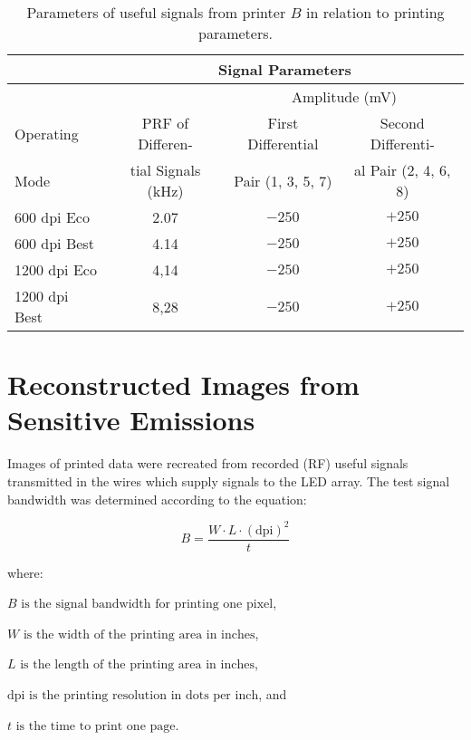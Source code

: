\documentclass[10pt,a4paper]{article}
\begin{document}
\begin{table}[ht]
    \centering
    \begin{tabular}{|l|c|c|c|}
        \hline
        & \multicolumn{3}{c|}{Signal Parameters} \\
        \hline
        & & \multicolumn{2}{c|}{Amplitude (\si{\milli\volt})} \\
        \hline
        Operating & PRF of Differen-
            & First Differential & Second Differenti- \\
        Mode & tial Signals (\si{\kilo\hertz})
            & Pair (1, 3, 5, 7) & al Pair (2, 4, 6, 8) \\
        \hline
        600 dpi Eco   & 2.07 & $-250$ & $+250$ \\
        600 dpi Best  & 4.14 & $-250$ & $+250$ \\
        1200 dpi Eco  & 4,14 & $-250$ & $+250$ \\
        1200 dpi Best & 8,28 & $-250$ & $+250$ \\
        \hline
    \end{tabular}
    \caption{Parameters of useful signals from printer $B$ in relation to
        printing parameters.}
    \label{table:Table_2}
\end{table}

\section{Reconstructed Images from Sensitive Emissions}

Images of printed data were recreated from recorded (RF) useful signals
transmitted in the wires which supply signals to the LED array. The test
signal bandwidth was determined according to the equation:

$$
B = \frac{W\cdot L\cdot (\text{dpi})^2}{t}
$$

\noindent where:

$B \text{ is the signal bandwidth for printing one pixel}$,

$W \text{ is the width of the printing area in inches}$,

$L \text{ is the length of the printing area in inches}$,

$\text{dpi is the printing resolution in dots per inch}$, and

$t \text{ is the time to print one page}$.



\singlespacing



\end{document}
